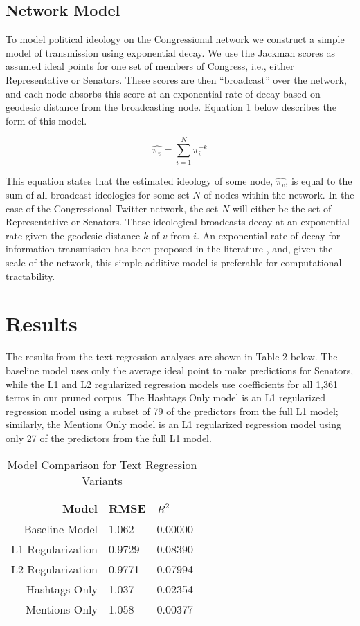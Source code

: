 \documentclass[10pt]{article}
\begin{document}
\subsection{Network Model} %
To model political ideology on the Congressional network we construct a simple model of transmission using exponential decay.  We use the Jackman scores as assumed ideal points for one set of members of Congress, i.e., either Representative or Senators.  These scores are then ``broadcast'' over the network, and each node absorbs this score at an exponential rate of decay based on geodesic distance from the broadcasting node.  Equation 1 below describes the form of this model.

\begin{equation}
    \hat{\pi_{v}} = \displaystyle\sum_{i=1}^{N} \pi_{i}^{-k}
\end{equation}

This equation states that the estimated ideology of some node, $\hat{\pi_{v}}$, is equal to the sum of all broadcast ideologies for some set $N$ of nodes within the network.  In the case of the Congressional Twitter network, the set $N$ will either be the set of Representative or Senators.  These ideological broadcasts decay at an exponential rate given the geodesic distance $k$ of $v$ from $i$.  An exponential rate of decay for information transmission has been proposed in the literature \citep{Wu_2004}, and, given the scale of the network, this simple additive model is preferable for computational tractability.  

\section{Results}
The results from the text regression analyses are shown in Table 2 below. The baseline model uses only the average ideal point to make predictions for Senators, while the L1 and L2 regularized regression models use coefficients for all 1,361 terms in our pruned corpus. The Hashtags Only model is an L1 regularized regression model using a subset of 79 of the predictors from the full L1 model; similarly, the Mentions Only model is an L1 regularized regression model using only 27 of the predictors from the full L1 model.

\begin{table}[htdp]
\caption{Model Comparison for Text Regression Variants}
\begin{center}
\begin{tabular}{|r|l|l|}
\hline
Model & RMSE & $R^2$\\
\hline
Baseline Model & 1.062 & 0.00000 \\
L1 Regularization & 0.9729 & 0.08390 \\
L2 Regularization & 0.9771 & 0.07994 \\
Hashtags Only & 1.037 & 0.02354 \\
Mentions Only & 1.058 & 0.00377 \\
\hline
\end{tabular}
\end{center}
\end{table}
\end{document}
